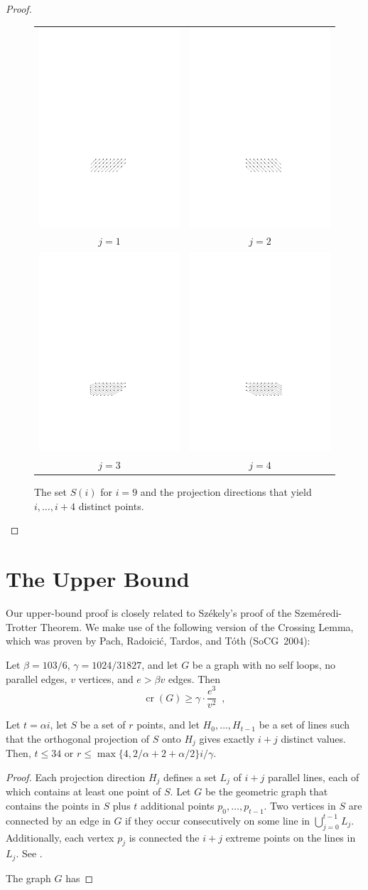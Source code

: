 \documentclass{patmorin}
\DeclareMathOperator{\cn}{cr}
\begin{document}
\begin{proof}
\begin{figure}
\begin{center}
\begin{tabular}{cc}
       \includegraphics{j1} & \includegraphics{j2} \\
        $j=1$ & $j=2$ \\
       \includegraphics{j3} & \includegraphics{j4} \\
        $j=3$ & $j=4$
    \end{tabular}
  \end{center}
  \caption{The set $S(i)$  for $i=9$ and the projection directions that yield $i,\ldots,i+4$ distinct points.}
\end{figure}
\end{proof}


\section{The Upper Bound}

Our upper-bound proof is closely related to Sz\'ekely's proof of the
Szem\'eredi-Trotter Theorem.  We make use of the following version of the
Crossing Lemma, which was proven by Pach, Radoici\'c, Tardos, and T\'oth
(SoCG~2004):

\begin{lem}\label{lem:crossing}
Let
$\beta=103/6$, $\gamma = 1024/31827$, and let
$G$ be a graph with no self loops, no parallel edges, $v$ vertices, and
$e > \beta v$ edges.  Then
\[
  \cn(G) \ge \gamma \cdot \frac{e^3}{v^2} \enspace ,
\]
\end{lem}


\begin{lem}
Let $t=\alpha i$, let $S$ be a set of $r$ points, and let
$H_0,\ldots,H_{t-1}$ be a set of lines such that the orthogonal projection
of $S$ onto $H_{j}$ gives exactly $i+j$ distinct values.  Then, $t\le 34$
or $r\le \max\{4,2/\alpha + 2 + \alpha/2\}i/\gamma$.
\end{lem}

\begin{proof}
Each projection direction $H_j$ defines a set $L_j$ of $i+j$ parallel
lines, each of which contains at least one point of $S$.  Let $G$ be the
geometric graph that contains the points in $S$ plus $t$ additional points
$p_0,\ldots,p_{t-1}$.  Two vertices in $S$ are connected by an edge in
$G$ if they occur consecutively on some line in $\bigcup_{j=0}^{t-1}L_j$.
Additionally, each vertex $p_j$ is connected the $i+j$ extreme points
on the lines in $L_j$.  See .

The graph $G$ has
\end{proof}
\end{document}
